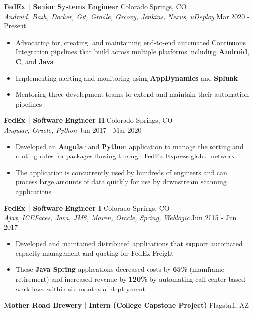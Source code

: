 \documentclass[a4paper]{article}
\begin{document}
\textbf{FedEx | Senior Systems Engineer} \hfill Colorado Springs, CO\\
\textsl{Android, Bash, Docker, Git, Gradle, Groovy, Jenkins, Nexus, uDeploy} \hfill Mar 2020 - Present\\
\vspace{-1mm}
\begin{itemize} \itemsep 1pt
	\item 	Advocating for, creating, and maintaining end-to-end automated Continuous Integration pipelines that build across multiple platforms including \textbf{Android}, \textbf{C}, and \textbf{Java}
	\item  Implementing alerting and monitoring using \textbf{AppDynamics} and \textbf{Splunk} 
	\item  Mentoring three development teams to extend and maintain their automation pipelines
\end{itemize}
\textbf{FedEx | Software Engineer II} \hfill Colorado Springs, CO\\
\textsl{Angular, Oracle, Python} \hfill Jun 2017 - Mar 2020\\
\vspace{-1mm}
\begin{itemize} \itemsep 1pt
	\item  Developed an \textbf{Angular} and \textbf{Python} application to manage the sorting and routing rules for packages flowing through FedEx Express global network 
	\item  The application is concurrently used by hundreds of engineers and can process large amounts of data quickly for use by downstream scanning applications
\end{itemize}
\textbf{FedEx | Software Engineer I} \hfill Colorado Springs, CO\\
\textsl{Ajax, ICEFaces, Java, JMS, Maven, Oracle, Spring, Weblogic} \hfill Jun 2015 - Jun 2017\\
\vspace{-1mm}
\begin{itemize} \itemsep 1pt
	\item  Developed and maintained distributed applications that support automated capacity management and quoting for FedEx Freight 
	\item These \textbf{Java Spring} applications decreased costs by \textbf{65\%} (mainframe retirement) and increased revenue by \textbf{120\%} by automating call-center based workflows within six months of deployment
\end{itemize}
\textbf{Mother Road Brewery | Intern (College Capstone Project)} \hfill Flagstaff, AZ\\
\end{document}
